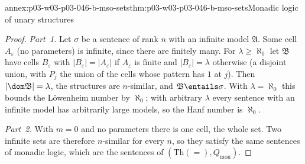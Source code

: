 \begin{annexitem}{annex:p03-w03-p03-046-b-mso-sets}{thm:p03-w03-p03-046-b-mso-sets}{Monadic logic of unary structures}
\begin{proof}
\emph{Part~1.} Let \(\sigma\) be a sentence of rank \(n\) with an infinite
model \(\mathfrak A\). Some cell \(A_\varepsilon\) (no parameters) is
infinite, since there are finitely many. For \(\lambda\ge\aleph_0\) let
\(\mathfrak B\) have cells \(B_\varepsilon\) with
\(|B_\varepsilon|=|A_\varepsilon|\) if \(A_\varepsilon\) is finite and
\(|B_\varepsilon|=\lambda\) otherwise (a disjoint union, with \(P_j\)
the union of the cells whose pattern has \(1\) at \(j\)). Then
\(\lvert\dom\mathfrak B\rvert=\lambda\), the structures are \(n\)-similar, and
\(\mathfrak B\entails\sigma\). With \(\lambda=\aleph_0\) this bounds the
L\"owenheim number by \(\aleph_0\); with arbitrary \(\lambda\) every
sentence with an infinite model has arbitrarily large models, so the Hanf
number is \(\aleph_0\).

\emph{Part~2.} With \(m=0\) and no parameters there is one cell, the
whole set. Two infinite sets are therefore \(n\)-similar for every \(n\),
so they satisfy the same sentences of monadic logic, which are the
sentences of \((\mathrm{Th}(=),Q_{\mathrm{mon}})\).
\end{proof}
\end{annexitem}

